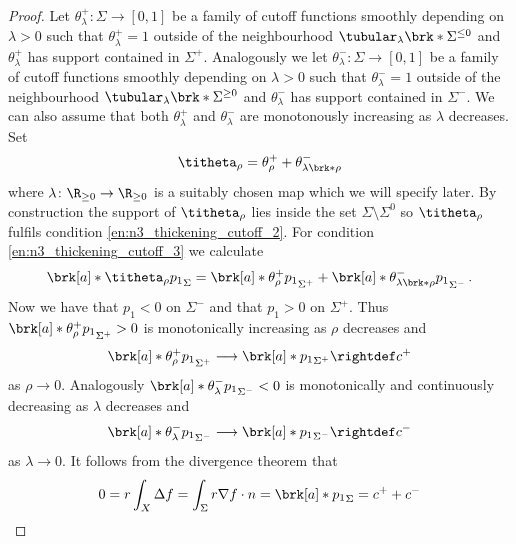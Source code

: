 \begin{proof}
  Let $\theta^+_\lambda\colon \Sigma\to[0,1]$ be a family of cutoff functions smoothly depending on $\lambda>0$ such that
  $\theta^+_\lambda=1$ outside of the neighbourhood $\tubular_{\lambda}\brk*{\Sigma^{\leq0}}$ and $\theta_\lambda^+$ has
  support contained in $\Sigma^+$.
  Analogously we let $\theta^-_\lambda\colon\Sigma\to[0,1]$ be a family of cutoff functions smoothly depending on $\lambda>0$
  such that $\theta^-_\lambda=1$ outside of the neighbourhood $\tubular_{\lambda}\brk*{\Sigma^{\geq0}}$ and $\theta_\lambda^-$ has
  support contained in $\Sigma^-$.
  We can also assume that both $\theta^+_\lambda$ and $\theta^-_\lambda$ are monotonously increasing as $\lambda$ decreases.
  Set 
  \begin{align}
    \titheta_\rho=\theta^+_\rho+\theta^-_{\lambda\brk*{\rho}}
    \label{eq:n3_thickening_cutoff_titheta}
  \end{align}
  where $\lambda\colon\R_{\geq0}\to\R_{\geq0}$
  is a suitably chosen map which we will specify later. By construction the support of $\titheta_\rho$ lies inside 
  the set $\Sigma\setminus\Sigma^0$ so $\titheta_\rho$ fulfils condition \ref{en:n3_thickening_cutoff_2}.
  For condition \ref{en:n3_thickening_cutoff_3}
  we calculate
  \begin{align}
    \brk[a]*{\titheta_\rho p_1}_\Sigma
    =\brk[a]*{\theta_\rho^+p_1}_{\Sigma^+}+\brk[a]*{\theta_{\lambda\brk*{\rho}}^-p_1}_{\Sigma^-}\,.
    \label{eq:n3_thickening_cutoff_meanVal}
  \end{align}
  Now we have that $p_1<0$ on $\Sigma^-$ and that $p_1>0$ on $\Sigma^+$.
  Thus $\brk[a]*{\theta_\rho^+p_1}_{\Sigma^+}>0$ is monotonically increasing as $\rho$ decreases and
  \begin{align*}
    \brk[a]*{\theta_\rho^+p_1}_{\Sigma^+}\longrightarrow \brk[a]*{p_1}_{\Sigma^+}\rightdef c^+
  \end{align*}
  as $\rho\to0$.
  Analogously $\brk[a]*{\theta_{\lambda}^-p_1}_{\Sigma^-}<0$ is
  monotonically and continuously decreasing as $\lambda$ decreases and 
  \begin{align*}
    \brk[a]*{\theta_\lambda^-p_1}_{\Sigma^-}\longrightarrow \brk[a]*{p_1}_{\Sigma^-}\rightdef c^-
  \end{align*}
  as $\lambda\to0$. It follows from the divergence theorem that
  \begin{align*}
    0=r\int_X\Delta f=\int_\Sigma r\nabla f\cdot n=\brk[a]*{p_1}_\Sigma
    =c^++c^-
  \end{align*}

\end{proof}
